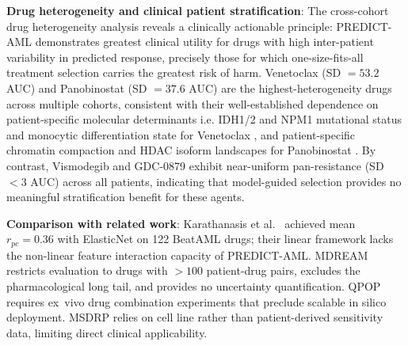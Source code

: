 \documentclass[pdflatex,sn-mathphys-num]{sn-jnl}
\theoremstyle{thmstyleone}
\theoremstyle{thmstyletwo}
\theoremstyle{thmstylethree}
\begin{document}
\textbf{Drug heterogeneity and clinical patient stratification}: The cross-cohort drug heterogeneity analysis reveals a clinically actionable principle: PREDICT-AML demonstrates greatest clinical utility for drugs with high inter-patient variability in predicted response, precisely those for which one-size-fits-all treatment selection carries the greatest risk of harm. Venetoclax (SD $= 53.2$ AUC) and Panobinostat (SD $= 37.6$ AUC) are the highest-heterogeneity drugs across multiple cohorts, consistent with their well-established dependence on patient-specific molecular determinants i.e. IDH1/2 and NPM1 mutational status and monocytic differentiation state for Venetoclax \cite{bisaillon2020genetic, zhang2020integrated, allen2025venetoclax}, and patient-specific chromatin compaction and HDAC isoform landscapes for Panobinostat \cite{tang2025epigenetic, kuhn2025epigenetic}. By contrast, Vismodegib and GDC-0879 exhibit near-uniform pan-resistance (SD $< 3$ AUC) across all patients, indicating that model-guided selection provides no meaningful stratification benefit for these agents. %


\textbf{Comparison with related work}: Karathanasis et al.\ \cite{karathanasis2024machine} achieved mean $r_{pc} = 0.36$ with ElasticNet on 122 BeatAML drugs; their linear framework lacks the non-linear feature interaction capacity of PREDICT-AML. MDREAM \cite{trac2023prediction} restricts evaluation to drugs with $>100$ patient-drug pairs, excludes the pharmacological long tail, and provides no uncertainty quantification. QPOP \cite{sahib2024combinatorial} requires ex~vivo drug combination experiments that preclude scalable in silico deployment. MSDRP \cite{zhao2023msdrp} relies on cell line rather than patient-derived sensitivity data, limiting direct clinical applicability.
\end{document}
